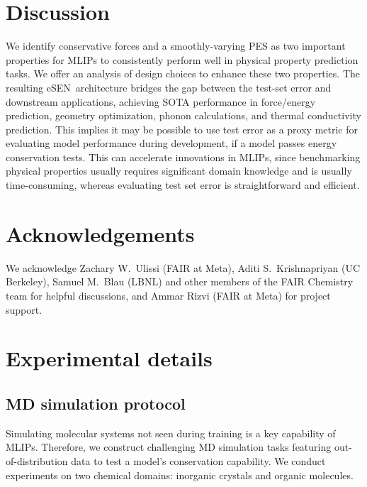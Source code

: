 \documentclass[twocolumn]{fairmeta}
\newcommand{\ourmodel}{eSEN}
\begin{document}
\section{Discussion}

We identify conservative forces and a smoothly-varying PES as two important properties for MLIPs to consistently perform well in physical property prediction tasks. We offer an analysis of design choices to enhance these two properties. The resulting \ourmodel\ architecture bridges the gap between the test-set error and downstream applications, achieving SOTA performance in force/energy prediction, geometry optimization, phonon calculations, and thermal conductivity prediction. This implies it may be possible to use test error as a proxy metric for evaluating model performance during development, if a model passes energy conservation tests. This can accelerate innovations in MLIPs, since benchmarking physical properties usually requires significant domain knowledge and is usually time-consuming, whereas evaluating test set error is straightforward and efficient. 

\section*{Acknowledgements}

We acknowledge Zachary W.~Ulissi (FAIR at Meta), Aditi S.~Krishnapriyan (UC Berkeley), Samuel M.~Blau (LBNL) and other members of the FAIR Chemistry team for helpful discussions, and Ammar Rizvi (FAIR at Meta) for project support.





\newpage
\clearpage
\appendix
\renewcommand\thefigure{\thesection.\arabic{figure}} 




\section{Experimental details}
\label{appendix:experimental}

\subsection{MD simulation protocol}
\label{appendix:conservation_protocol}

Simulating molecular systems not seen during training is a key capability of MLIPs. Therefore, we construct challenging MD simulation tasks featuring out-of-distribution data to test a model's conservation capability. We conduct experiments on two chemical domains: inorganic crystals and organic molecules.
\end{document}
